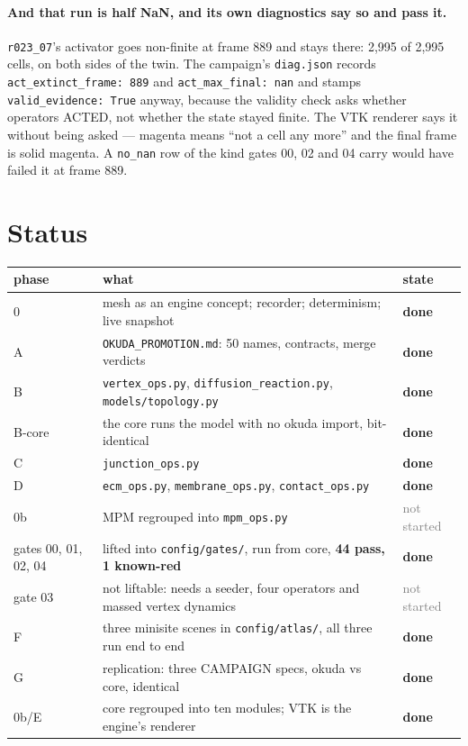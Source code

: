 \documentclass[11pt,a4paper]{article}
\newcommand{\code}[1]{\texttt{\small #1}}
\newcommand{\dn}{\textcolor{good}{\textbf{done}}}
\newcommand{\ns}{\textcolor{grey}{not started}}
\begin{document}
\paragraph{And that run is half NaN, and its own diagnostics say so and pass it.}
\code{r023\_07}'s activator goes non-finite at frame 889 and stays there: 2{,}995 of 2{,}995 cells,
on both sides of the twin. The campaign's \code{diag.json} records \code{act\_extinct\_frame: 889}
and \code{act\_max\_final: nan} and stamps \code{valid\_evidence: True} anyway, because the validity
check asks whether operators ACTED, not whether the state stayed finite. The VTK renderer says it
without being asked --- magenta means ``not a cell any more'' and the final frame is solid magenta.
A \code{no\_nan} row of the kind gates 00, 02 and 04 carry would have failed it at frame 889.

\gatetable

\section{Status}

\begin{center}\small
\begin{tabular}{@{}lll@{}}\toprule
phase & what & state\\\midrule
0  & mesh as an engine concept; recorder; determinism; live snapshot & \dn\\
A  & \code{OKUDA\_PROMOTION.md}: 50 names, contracts, merge verdicts & \dn\\
B  & \code{vertex\_ops.py}, \code{diffusion\_reaction.py}, \code{models/topology.py} & \dn\\
B-core & the core runs the model with no okuda import, bit-identical & \dn\\
C  & \code{junction\_ops.py} & \dn\\
D  & \code{ecm\_ops.py}, \code{membrane\_ops.py}, \code{contact\_ops.py} & \dn\\
0b & MPM regrouped into \code{mpm\_ops.py} & \ns\\
gates 00, 01, 02, 04 & lifted into \code{config/gates/}, run from core, \textbf{44 pass, 1 known-red} & \dn\\
gate 03 & not liftable: needs a seeder, four operators and massed vertex dynamics & \ns\\
F  & three minisite scenes in \code{config/atlas/}, all three run end to end & \dn\\
G  & replication: three CAMPAIGN specs, okuda vs core, identical & \dn\\
0b/E & core regrouped into ten modules; VTK is the engine's renderer & \dn\\

\bottomrule
\end{tabular}
\end{center}
\end{document}
